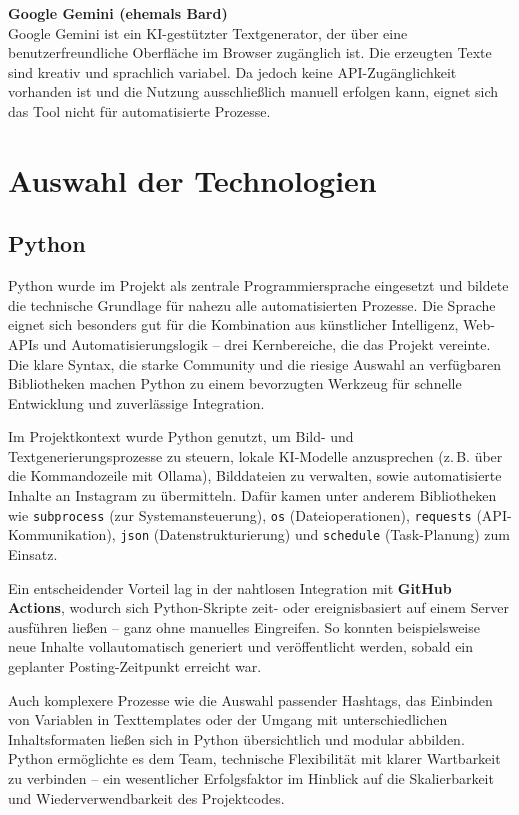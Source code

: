 \documentclass[a4paper,12pt]{article}
\begin{document}
\textbf{Google Gemini (ehemals Bard)} \\
Google Gemini ist ein KI-gestützter Textgenerator, der über eine benutzerfreundliche Oberfläche im Browser zugänglich ist. Die erzeugten Texte sind kreativ und sprachlich variabel. Da jedoch keine API-Zugänglichkeit vorhanden ist und die Nutzung ausschließlich manuell erfolgen kann, eignet sich das Tool nicht für automatisierte Prozesse.

\clearpage

\section{Auswahl der Technologien}
\subsection{Python}

Python wurde im Projekt als zentrale Programmiersprache eingesetzt und bildete die technische Grundlage für nahezu alle automatisierten Prozesse. Die Sprache eignet sich besonders gut für die Kombination aus künstlicher Intelligenz, Web-APIs und Automatisierungslogik – drei Kernbereiche, die das Projekt vereinte. Die klare Syntax, die starke Community und die riesige Auswahl an verfügbaren Bibliotheken machen Python zu einem bevorzugten Werkzeug für schnelle Entwicklung und zuverlässige Integration.

Im Projektkontext wurde Python genutzt, um Bild- und Textgenerierungsprozesse zu steuern, lokale KI-Modelle anzusprechen (z.\,B. über die Kommandozeile mit Ollama), Bilddateien zu verwalten, sowie automatisierte Inhalte an Instagram zu übermitteln. Dafür kamen unter anderem Bibliotheken wie \texttt{subprocess} (zur Systemansteuerung), \texttt{os} (Dateioperationen), \texttt{requests} (API-Kommunikation), \texttt{json} (Datenstrukturierung) und \texttt{schedule} (Task-Planung) zum Einsatz.

Ein entscheidender Vorteil lag in der nahtlosen Integration mit \textbf{GitHub Actions}, wodurch sich Python-Skripte zeit- oder ereignisbasiert auf einem Server ausführen ließen – ganz ohne manuelles Eingreifen. So konnten beispielsweise neue Inhalte vollautomatisch generiert und veröffentlicht werden, sobald ein geplanter Posting-Zeitpunkt erreicht war.

Auch komplexere Prozesse wie die Auswahl passender Hashtags, das Einbinden von Variablen in Texttemplates oder der Umgang mit unterschiedlichen Inhaltsformaten ließen sich in Python übersichtlich und modular abbilden. Python ermöglichte es dem Team, technische Flexibilität mit klarer Wartbarkeit zu verbinden – ein wesentlicher Erfolgsfaktor im Hinblick auf die Skalierbarkeit und Wiederverwendbarkeit des Projektcodes.
\end{document}
